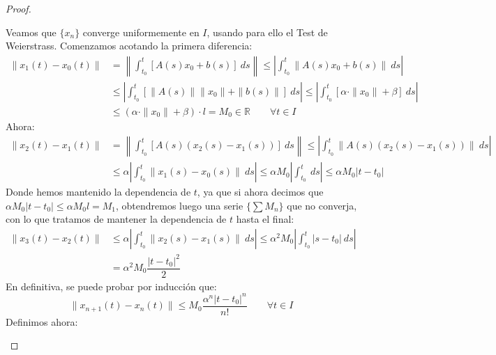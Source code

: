 \begin{teo}
\begin{proof}
\begin{itemize}
\begin{description}
                        Veamos que $\{x_n\}$ converge uniformemente en $I$, usando para ello el Test de Weierstrass. Comenzamos acotando la primera diferencia:
                        \begin{align*}
                            \|x_1(t) - x_0(t)\| &= \left\|\int_{t_0}^{t} [A(s)x_0+b(s)]~ds \right\| \leq \left|\int_{t_0}^{t}\| A(s)x_0 + b(s)\|~ds \right| \\
                                                &\leq \left|\int_{t_0}^{t}\left[ \|A(s)\|\|x_0\| + \|b(s)\|\right]~ds \right| \leq \left|\int_{t_0}^{t} [\alpha\cdot  \|x_0\| + \beta]~ds \right| \\
                                                &\leq (\alpha\cdot \|x_0\|+\beta)\cdot l = M_0 \in \mathbb{R} \qquad \forall t\in I
                        \end{align*}
                        Ahora:
                        \begin{align*}
                            \|x_2(t) - x_1(t)\| &= \left\|\int_{t_0}^{t} [A(s)(x_2(s)-x_1(s))]~ds \right\| \leq  \left|\int_{t_0}^{t} \|A(s)(x_2(s)-x_1(s))\|~ds \right| \\
                                                &\leq \alpha\left|\int_{t_0}^{t} \|x_1(s)-x_0(s)\|~ds \right| \leq \alpha M_0 \left|\int_{t_0}^{t} ~ds \right| \leq \alpha M_0 |t-t_0|
                        \end{align*}
                        Donde hemos mantenido la dependencia de $t$, ya que si ahora decimos que $\alpha M_0 |t-t_0|\leq \alpha M_0 l = M_1$, obtendremos luego una serie $\{\sum M_n\}$ que no converja, con lo que tratamos de mantener la dependencia de $t$ hasta el final:
                        \begin{align*}
                            \|x_3(t)-x_2(t)\| &\leq \alpha \left|\int_{t_0}^{t} \|x_2(s)-x_1(s)\|~ds \right| \leq \alpha^2 M_0 \left|\int_{t_0}^{t} |s-t_0|~ds \right| \\
                                              &= \alpha^2 M_0 \dfrac{{|t-t_0|}^{2}}{2}
                        \end{align*}
                        En definitiva, se puede probar por inducción que:
                        \begin{equation*}
                            \|x_{n+1}(t) - x_n(t)\| \leq M_0 \dfrac{\alpha^n{|t-t_0|}^{n}}{n!} \qquad \forall t\in I
                        \end{equation*}
                        Definimos ahora:
                        \begin{equation*}

\end{equation*}
\end{description}
\end{itemize}
\end{proof}
\end{teo}
